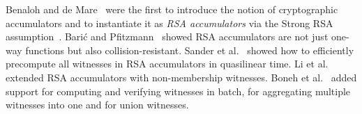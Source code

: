 \newcommand{\rsaPrecompFigure}{
\begin{figure*}[t]
{
    \normalsize
    \begin{center}
        \begin{forest}
        for tree={
            inner sep=4,
        }
        [{$g, \{e_1,\dots,e_8\}$}
            [{$g^{e_5 \cdots e_8}, \{e_1,\dots,e_4\}$}
                [{$g^{e_3 \cdots e_8}, \{e_1,e_2\}$}
                    [{$g^{e_2 \cdots e_8}, \{e_1\}$}
                        [, no edge, tier=odd ]
                    ]
                    [{$g^{e_1 e_3 \cdots e_8}, \{e_2\}$}
                        , tier=odd
                    ]
                ]
                [{$g^{e_1 e_2 e_5 \cdots e_8}, \{e_3,e_4\}$}
                    [{$g^{e_1 e_2 e_4 \cdots e_8}, \{e_3\}$}
                        [, no edge, tier=odd ]
                    ]
                    [{$g^{e_1 \cdots e_3 e_5 \cdots e_8}, \{e_4\}$}
                        , tier=odd
                    ]
                ]
            ]
            [{$g^{e_1 \cdots e_4}, \{e_5,\dots,e_8\}$}
                [{$g^{e_1 \cdots e_4 e_7 e_8}, \{e_5,e_6\}$}
                    [{$g^{e_1 \cdots e_4 e_6 \cdots e_8}, \{e_5\}$}
                        [, no edge, tier=odd ]
                    ]
                    [{$g^{e_1 \cdots e_5 e_7 e_8}, \{e_6\}$}
                        , tier=odd
                    ]
                ]
                [{$g^{e_1 \cdots e_6}, \{e_7,e_8\}$}
                    [{$g^{e_1 \cdots e_6 e_8}, \{e_7\}$}
                        [, no edge, tier=odd ]
                    ]
                    [{$g^{e_1 \cdots e_7}, \{e_8\}$}
                        , tier=odd
                    ]
                ]
            ]
        ]
        \end{forest}
    \end{center}
}
\caption{Divide-and-conquer approach by Sander et al.~\cite{SSY01} for precomputing $n$ membership witnesses for $T=\{e_1,\dots,e_n\}$ w.r.t. the RSA accumulator $\mathsf{acc}(T)$ in $\Theta(n\log{n})$ time. Here $n=8$.}
\label{f:rsa-acc-membproof-precomp}
\end{figure*}
}

Benaloh and de Mare~\cite{acc-rsa} were the first to introduce the notion of cryptographic accumulators and to instantiate it as \textit{RSA accumulators} via the Strong RSA assumption~\cite{BP97}.
Bari\'{c} and Pfitzmann~\cite{BP97} showed RSA accumulators are not just one-way functions but also collision-resistant.
Sander et al.~\cite{SSY01} showed how to efficiently precompute all witnesses in RSA accumulators in quasilinear time.
Li et al.~\cite{LLX07} extended RSA accumulators with non-membership witnesses.
Boneh et al.~\cite{BBF19} added support for computing and verifying witnesses in batch, for aggregating multiple witnesses into one and for union witnesses.

